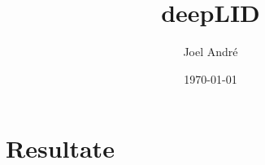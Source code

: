 \documentclass[12pt,twoside]{article}
\title{deepLID}
\author{Joel André}
\date{\today{}}
\begin{document}
	
	
	
	\tableofcontents
	\newpage
	
	
	
	
	
	\section{Resultate}
	
	
	
	\printbibliography
	\listoffigures
\end{document}
